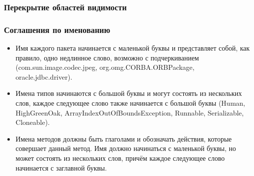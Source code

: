 \documentclass[default]{beamer}
\begin{document}
	\begin{frame}
		\frametitle{Перекрытие областей видимости}
		
		\begin{overlayarea}{\textwidth}{0.5\textheight}
			\begin{itemize}
			\end{itemize}
		\end{overlayarea}

	\end{frame}

	\begin{frame}
		\frametitle{Соглашения по именованию}
		
		\begin{itemize}
			\item Имя каждого пакета начинается с маленькой буквы и представляет собой, как правило, одно недлинное слово, возможно с подчеркиванием (com.sun.image.codec.jpeg, org.omg.CORBA.ORBPackage, oracle.jdbc.driver).
			\item Имена типов начинаются с большой буквы и могут состоять из нескольких слов, каждое следующее слово также начинается с большой буквы (Human, HighGreenOak, ArrayIndexOutOfBoundsException, Runnable, Serializable, Cloneable).
			\item Имена методов должны быть глаголами и обозначать действия, которые совершает данный метод. Имя должно начинаться с маленькой буквы, но может состоять из нескольких слов, причём каждое следующее слово начинается с заглавной буквы.
		\end{itemize}
	\end{frame}
	
\end{document}
